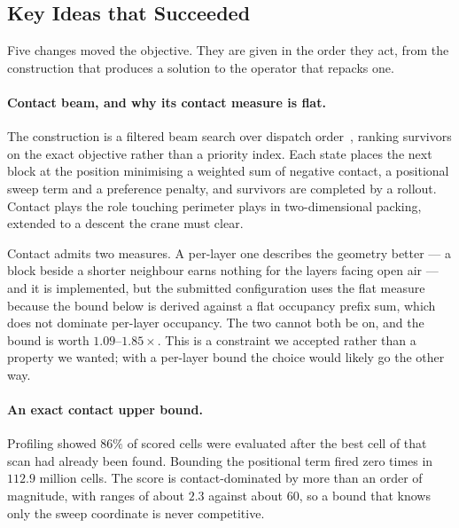 \documentclass[runningheads]{llncs}
\begin{document}
\subsection{Key Ideas that Succeeded}
\label{sec:succeeded}

Five changes moved the objective. They are given in the order they act, from the construction that
produces a solution to the operator that repacks one.

\paragraph{Contact beam, and why its contact measure is flat.}
The construction is a filtered beam search over dispatch order~\cite{ow1988}, ranking survivors on
the exact objective rather than a priority index. Each state places the next block at the position
minimising a weighted sum of negative contact, a positional sweep term and a preference penalty,
and survivors are completed by a rollout. Contact plays the role touching perimeter plays in
two-dimensional packing, extended to a descent the crane must clear.

Contact admits two measures. A per-layer one describes the geometry better --- a block beside a
shorter neighbour earns nothing for the layers facing open air --- and it is implemented, but the
submitted configuration uses the flat measure because the bound below is derived against a flat
occupancy prefix sum, which does not dominate per-layer occupancy. The two cannot both be on, and
the bound is worth $1.09$--$1.85\times$. This is a constraint we accepted rather than a property we
wanted; with a per-layer bound the choice would likely go the other way.

\paragraph{An exact contact upper bound.}
Profiling showed $86\%$ of scored cells were evaluated after the best cell of that scan had already
been found. Bounding the positional term fired zero times in $112.9$ million cells. The score is
contact-dominated by more than an order of magnitude, with ranges of about $2.3$ against about
$60$, so a bound that knows only the sweep coordinate is never competitive.
\end{document}
